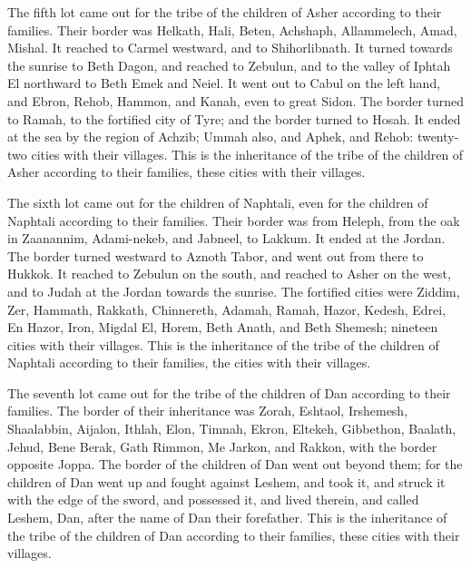  The fifth lot came out for the tribe of the children of
Asher according to their families.  Their border was
Helkath, Hali, Beten, Achshaph,  Allammelech, Amad,
Mishal. It reached to Carmel westward, and to Shihorlibnath.
 It turned towards the sunrise to Beth Dagon, and reached
to Zebulun, and to the valley of Iphtah El northward to Beth Emek and
Neiel. It went out to Cabul on the left hand,  and Ebron,
Rehob, Hammon, and Kanah, even to great Sidon.  The
border turned to Ramah, to the fortified city of Tyre; and the border
turned to Hosah. It ended at the sea by the region of Achzib;
 Ummah also, and Aphek, and Rehob: twenty-two cities with
their villages.  This is the inheritance of the tribe of
the children of Asher according to their families, these cities with
their villages.

 The sixth lot came out for the children of Naphtali,
even for the children of Naphtali according to their families.
 Their border was from Heleph, from the oak in Zaanannim,
Adami-nekeb, and Jabneel, to Lakkum. It ended at the Jordan.
 The border turned westward to Aznoth Tabor, and went out
from there to Hukkok. It reached to Zebulun on the south, and reached to
Asher on the west, and to Judah at the Jordan towards the sunrise.
 The fortified cities were Ziddim, Zer, Hammath, Rakkath,
Chinnereth,  Adamah, Ramah, Hazor, 
Kedesh, Edrei, En Hazor,  Iron, Migdal El, Horem, Beth
Anath, and Beth Shemesh; nineteen cities with their villages.
 This is the inheritance of the tribe of the children of
Naphtali according to their families, the cities with their villages.

 The seventh lot came out for the tribe of the children
of Dan according to their families.  The border of their
inheritance was Zorah, Eshtaol, Irshemesh,  Shaalabbin,
Aijalon, Ithlah,  Elon, Timnah, Ekron, 
Eltekeh, Gibbethon, Baalath,  Jehud, Bene Berak, Gath
Rimmon,  Me Jarkon, and Rakkon, with the border opposite
Joppa.  The border of the children of Dan went out beyond
them; for the children of Dan went up and fought against Leshem, and
took it, and struck it with the edge of the sword, and possessed it, and
lived therein, and called Leshem, Dan, after the name of Dan their
forefather.  This is the inheritance of the tribe of the
children of Dan according to their families, these cities with their
villages.

